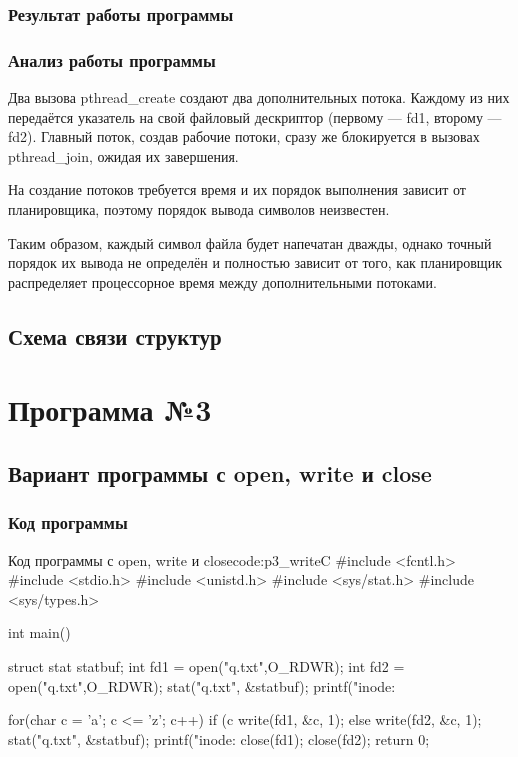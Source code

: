 \subsection{Результат работы программы}


\subsection{Анализ работы программы}

Два вызова pthread\_create создают два дополнительных потока. Каждому из них передаётся указатель на свой файловый дескриптор (первому --- fd1, второму --- fd2). Главный поток, создав рабочие потоки, сразу же блокируется в вызовах pthread\_join, ожидая их завершения.

На создание потоков требуется время и их порядок выполнения зависит от планировщика, поэтому порядок вывода символов неизвестен.

Таким образом, каждый символ файла будет напечатан дважды, однако точный порядок их вывода не определён и полностью зависит от того, как планировщик распределяет процессорное время между дополнительными потоками.

\section{Схема связи структур}


\newpage
\chapter{Программа №3}

\section{Вариант программы с open, write и close}

\subsection{Код программы}

\begin{mylisting}{Код программы с open, write и close}{code:p3_write}{C}
#include <fcntl.h>
#include <stdio.h>
#include <unistd.h>
#include <sys/stat.h>
#include <sys/types.h>

int main() 
{
	struct stat statbuf;
	int fd1 = open("q.txt",O_RDWR);
	int fd2 = open("q.txt",O_RDWR);
	stat("q.txt", &statbuf);
	printf("inode: %
	
	for(char c = 'a'; c <= 'z'; c++)
	{
		if (c%
		write(fd1, &c, 1);
		else
		write(fd2, &c, 1);
		stat("q.txt", &statbuf);
		printf("inode: %
	}
	close(fd1);
	close(fd2);
	return 0;
}
\end{mylisting}

